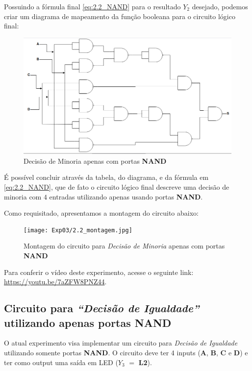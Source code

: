 \documentclass[12pt]{article}
\begin{document}
Possuindo a fórmula final \ref{eq:2.2_NAND} para o resultado \(Y_{2}\) desejado,
podemos criar um diagrama de mapeamento da função booleana para o circuito
lógico final:

\begin{figure}[H]
    \centering
    \includegraphics[width=.9\textwidth]{Exp03/2.2.png}
    \caption{Decisão de Minoria apenas com portas \textbf{NAND}}
    \label{fig:decisao_minoria}
\end{figure}

É possível concluir através da tabela, do diagrama, e da fórmula em
\ref{eq:2.2_NAND}, que de fato o circuito lógico final descreve uma decisão de
minoria com \(4\) entradas utilizando apenas usando portas \textbf{NAND}.

Como requisitado, apresentamos a montagem do circuito abaixo:

\begin{figure}[H]
    \centering
    \texttt{[image: Exp03/2.2\_montagem.jpg]}
    \caption{Montagem do circuito para \textit{Decisão de Minoria} apenas com portas \textbf{NAND}}
    \label{fig:decisao_minoria_montagem}
\end{figure}

Para conferir o vídeo deste experimento, acesse o seguinte link:
\href{https://youtu.be/7aZFW8PNZ44}{https://youtu.be/7aZFW8PNZ44}.
\\[2em]

\subsection{Circuito para \textit{``Decisão de Igualdade''} utilizando apenas portas \textbf{NAND}}\label{sec:decisao_igualdade}

O atual experimento visa implementar um circuito para \textit{Decisão de
Igualdade} utilizando somente portas \textbf{NAND}. O circuito deve ter 4 inputs
(\textbf{A}, \textbf{B}, \textbf{C} e \textbf{D}) e ter como output uma saída em
LED (\(Y_{3}\) \( = \) \textbf{L2}).
\end{document}
